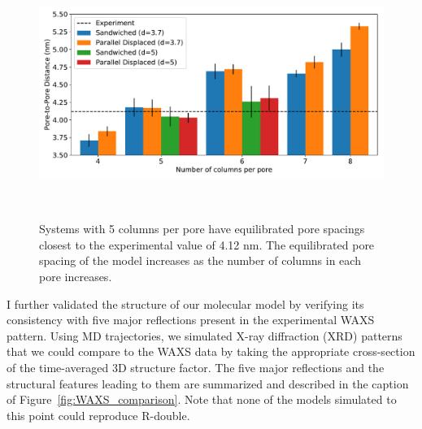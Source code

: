 \documentclass{article}
\begin{document}
  \begin{figure}
    \centering
    \vspace{-0.5cm}
    \includegraphics[width=\linewidth]{p2p.pdf}
    \caption{Systems with 5 columns per pore have equilibrated pore spacings
            closest to the experimental value of 4.12 nm. The equilibrated 
            pore spacing of the model increases as the number of columns in
            each pore increases.}~\label{fig:p2p}
    \vspace{-1.25cm}
  \end{figure}
  

  I further validated the structure of our molecular model by verifying 
  its consistency with five major reflections present in the experimental
  WAXS pattern. Using MD trajectories, we simulated X-ray diffraction (XRD)
  patterns that we could compare to the WAXS data by taking the appropriate
  cross-section of the time-averaged 3D structure factor. The five major 
  reflections and the structural features leading to them are summarized
  and described in the caption of Figure~\ref{fig:WAXS_comparison}. Note that
  none of the models simulated to this point could reproduce R-double.   
  
\end{document}
